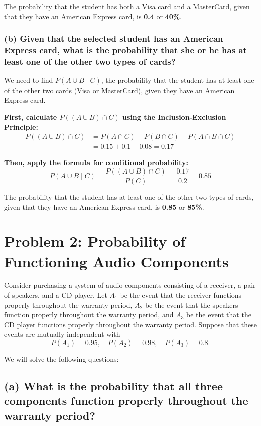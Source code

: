 \documentclass{article}
\begin{document}
The probability that the student has both a Visa card and a MasterCard, given that they have an American Express card, is \textbf{0.4} or \textbf{40\%}.

\subsubsection*{(b) Given that the selected student has an American Express card, what is the probability that she or he has at least one of the other two types of cards?}

We need to find \( P(A \cup B \mid C) \), the probability that the student has at least one of the other two cards (Visa or MasterCard), given they have an American Express card.

\textbf{First, calculate \( P((A \cup B) \cap C) \) using the Inclusion-Exclusion Principle:}
\[
\begin{aligned}
P((A \cup B) \cap C) &= P(A \cap C) + P(B \cap C) - P(A \cap B \cap C) \\
&= 0.15 + 0.1 - 0.08 = 0.17
\end{aligned}
\]

\textbf{Then, apply the formula for conditional probability:}
\[
P(A \cup B \mid C) = \frac{P((A \cup B) \cap C)}{P(C)} = \frac{0.17}{0.2} = 0.85
\]

The probability that the student has at least one of the other two types of cards, given that they have an American Express card, is \textbf{0.85} or \textbf{85\%}.


\section*{Problem 2: Probability of Functioning Audio Components}

Consider purchasing a system of audio components consisting of a receiver, a pair of speakers, and a CD player. Let \(A_1\) be the event that the receiver functions properly throughout the warranty period, \(A_2\) be the event that the speakers function properly throughout the warranty period, and \(A_3\) be the event that the CD player functions properly throughout the warranty period. Suppose that these events are mutually independent with
\[
P(A_1) = 0.95, \quad P(A_2) = 0.98, \quad P(A_3) = 0.8.
\]

We will solve the following questions:

\subsection*{(a) What is the probability that all three components function properly throughout the warranty period?}
\end{document}
